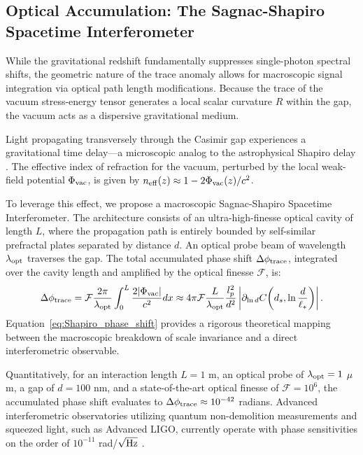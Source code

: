 \documentclass[12pt,letterpaper]{article}
\begin{document}
\subsection{Optical Accumulation: The Sagnac-Shapiro Spacetime Interferometer}

While the gravitational redshift fundamentally suppresses single-photon spectral shifts, the geometric nature of the trace anomaly allows for macroscopic signal integration via optical path length modifications. Because the trace of the vacuum stress-energy tensor generates a local scalar curvature $R$ within the gap, the vacuum acts as a dispersive gravitational medium. 

Light propagating transversely through the Casimir gap experiences a gravitational time delay---a microscopic analog to the astrophysical Shapiro delay \cite{will2014}. The effective index of refraction for the vacuum, perturbed by the local weak-field potential $\Phi_{\rm vac}$, is given by $n_{\rm eff}(z) \approx 1 - 2\Phi_{\rm vac}(z)/c^2$. 

To leverage this effect, we propose a macroscopic Sagnac-Shapiro Spacetime Interferometer. The architecture consists of an ultra-high-finesse optical cavity of length $L$, where the propagation path is entirely bounded by self-similar prefractal plates separated by distance $d$. An optical probe beam of wavelength $\lambda_{\rm opt}$ traverses the gap. The total accumulated phase shift $\Delta \phi_{\rm trace}$, integrated over the cavity length and amplified by the optical finesse $\mathcal{F}$, is:
\begin{equation}
\Delta \phi_{\rm trace} = \mathcal{F} \frac{2\pi}{\lambda_{\rm opt}} \int_0^L \frac{2|\Phi_{\rm vac}|}{c^2} dx \approx 4\pi \mathcal{F} \frac{L}{\lambda_{\rm opt}} \frac{l_p^2}{d^2} \left| \partial_{\ln d}C\!\left(d_s,\ln\frac{d}{\ell_*}\right) \right|.
\label{eq:Shapiro_phase_shift}
\end{equation}
Equation~\eqref{eq:Shapiro_phase_shift} provides a rigorous theoretical mapping between the macroscopic breakdown of scale invariance and a direct interferometric observable. 

Quantitatively, for an interaction length $L = 1$ m, an optical probe of $\lambda_{\rm opt} = 1$ $\mu$m, a gap of $d = 100$ nm, and a state-of-the-art optical finesse of $\mathcal{F} = 10^6$, the accumulated phase shift evaluates to $\Delta \phi_{\rm trace} \approx 10^{-42}$ radians. Advanced interferometric observatories utilizing quantum non-demolition measurements and squeezed light, such as Advanced LIGO, currently operate with phase sensitivities on the order of $10^{-11}$ rad/$\sqrt{\rm Hz}$ \cite{aasi2015}. 
\end{document}

